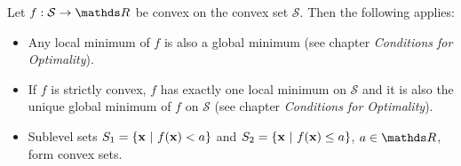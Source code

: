 \begin{vbframe}

Let $f:\mathcal{S} \to \R$ be convex on the convex set $\mathcal{S}$. Then the following applies:

\begin{itemize}
\item Any local minimum of $f$ is also a global minimum (see chapter \emph{Conditions for Optimality}).
\item If $f$ is strictly convex, $f$ has exactly one local minimum on $\mathcal{S}$ and it is also the unique global minimum of $f$ on $\mathcal{S}$ (see chapter \emph{Conditions for Optimality}). 
\item Sublevel sets $S_1 = \{\mathbf{x}~|~f(\mathbf{x}) < a\}$ and $S_2 = \{\mathbf{x}~|~f(\mathbf{x}) \leq a \}$, $a\in \R$, form convex sets.
\end{itemize}

\end{vbframe}


  \endlecture
  
  
  
  